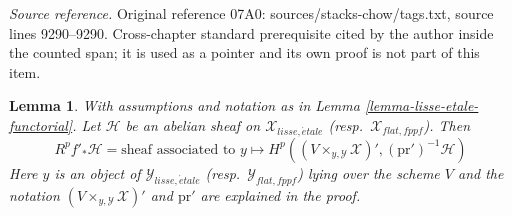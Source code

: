 \documentclass[10pt,a4paper]{amsart}
\theoremstyle{plain}
\newtheorem{lemma}[subsection]{Lemma}
\theoremstyle{definition}
\theoremstyle{remark}
\numberwithin{equation}{subsection}
\def\etale{{\acute{e}tale}}
\begin{document}
\noindent\textit{Source reference.} Original reference 07A0: sources/stacks-chow/tags.txt, source lines 9290--9290. Cross-chapter standard prerequisite cited by the author inside the counted span; it is used as a pointer and its own proof is not part of this item.\par\medskip
\begin{lemma}
\label{lemma-lisse-etale-functorial-pushforward}
With assumptions and notation as in Lemma \ref{lemma-lisse-etale-functorial}.
Let $\mathcal{H}$  be an abelian sheaf on $\mathcal{X}_{lisse,\etale}$
(resp.\ $\mathcal{X}_{flat,fppf}$). Then
\begin{equation}
\label{equation-higher-direct-image-lisse-etale}
R^pf'_*\mathcal{H} =
\text{sheaf associated to }y \longmapsto
H^p((V \times_{y, \mathcal{Y}} \mathcal{X})', (\text{pr}')^{-1}\mathcal{H})
\end{equation}
Here $y$ is an object of $\mathcal{Y}_{lisse,\etale}$
(resp.\ $\mathcal{Y}_{flat,fppf}$) lying over the scheme $V$
and the notation $(V \times_{y, \mathcal{Y}} \mathcal{X})'$
and $\text{pr}'$ are explained in the proof.
\end{lemma}
\end{document}
